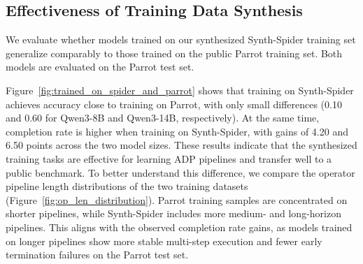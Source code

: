 \subsection{Effectiveness of Training Data Synthesis}
\label{subsec:data_effectiveness}





We evaluate whether models trained on our synthesized Synth-Spider training set generalize comparably to those trained on the public Parrot training set. Both models are evaluated on the Parrot test set.

Figure~\ref{fig:trained_on_spider_and_parrot} shows that training on Synth-Spider achieves accuracy close to training on Parrot, with only small differences (0.10 and 0.60 for Qwen3-8B and Qwen3-14B, respectively). At the same time, completion rate is higher when training on Synth-Spider, with gains of 4.20 and 6.50 points across the two model sizes. These results indicate that the synthesized training tasks are effective for learning ADP pipelines and transfer well to a public benchmark.
To better understand this difference, we compare the operator pipeline length distributions of the two training datasets (Figure~\ref{fig:op_len_distribution}). Parrot training samples are concentrated on shorter pipelines, while Synth-Spider includes more medium- and long-horizon pipelines. This aligns with the observed completion rate gains, as models trained on longer pipelines show more stable multi-step execution and fewer early termination failures on the Parrot test set.

%

